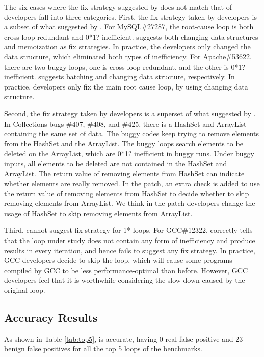 The six cases where the fix strategy suggested by \Tool does not match that of 
developers fall into three categories.
First, the fix strategy taken by developers is a subset of what suggested by 
\Tool.
{\color{red} For MySQL\#27287, the root-cause loop
is both cross-loop redundant and 0*1? inefficient. \Tool suggests both changing
data structures and memoization as fix strategies. In practice, the developers
only changed the data structure, which eliminated both types of inefficiency. 
For Apache\#53622, there are two buggy loops, one is cross-loop redundant, and the other is 0*1? inefficient. 
\Tool suggests batching and changing data structure, respectively. 
In practice, developers only fix the main root cause loop, by using changing data structure.} 

Second, the fix strategy taken by developers is a superset of what suggested by
\Tool.
{\color{red} In Collections bugs \#407, \#408, and \#425, there is a HashSet and ArrayList containing the same set of data. 
The buggy codes keep trying to remove elements from the HashSet and the ArrayList. 
The buggy loops search elements to be deleted on the ArrayList, which are 0*1? inefficient in buggy runs. 
Under buggy inputs, all elements to be deleted are not contained in the HashSet and ArrayList. 
The return value of removing elements from HashSet can indicate whether elements are really removed. 
In the patch, an extra check is added to use the return value of removing elements from HashSet 
to decide whether to skip removing elements from ArrayList. 
We think in the patch developers change the usage of HashSet to skip removing elements from ArrayList. }

Third, \Tool cannot suggest fix strategy for 1* loops.
For GCC\#12322, \Tool correctly tells that the loop under study
does not contain any form of inefficiency and produce results in every 
iteration, and hence fails to suggest any fix strategy. In practice, GCC
developers decide to skip the loop, which will cause some programs compiled by
GCC
to be less performance-optimal than before. However, GCC developers feel
that it is worthwhile considering the slow-down caused by the original loop.

\subsection{Accuracy Results}
\label{sec:result_acc}



As shown in Table \ref{tab:top5}, \Tool is accurate, having 0 real
false positive and 23 benign false positives for all the top 5 loops
of the \allbugs benchmarks.

